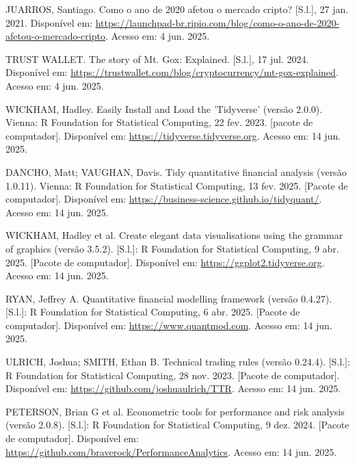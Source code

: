 \begin{thebibliography}{99}
     JUARROS, Santiago. Como o ano de 2020 afetou o mercado cripto? [S.l.], 27 jan. 2021. Disponível em: 
    \href{https://launchpad-br.ripio.com/blog/como-o-ano-de-2020-afetou-o-mercado-cripto}{https://launchpad-br.ripio.com/blog/como-o-ano-de-2020-afetou-o-mercado-cripto}. 
    Acesso em: 4 jun. 2025.
    
     TRUST WALLET. The story of Mt. Gox: Explained. [S.l.], 17 jul. 2024. Disponível em: 
    \href{https://trustwallet.com/blog/cryptocurrency/mt-gox-explained}{https://trustwallet.com/blog/cryptocurrency/mt-gox-explained}. 
    Acesso em: 4 jun. 2025.
    
     WICKHAM, Hadley. Easily Install and Load the 'Tidyverse' (versão 2.0.0). Vienna: R Foundation for Statistical Computing, 22 fev. 2023. [pacote de computador]. Disponível em: 
    \href{https://tidyverse.tidyverse.org}{https://tidyverse.tidyverse.org}. 
    Acesso em: 14 jun. 2025.
    
     DANCHO, Matt; VAUGHAN, Davis. Tidy quantitative financial analysis (versão 1.0.11). Vienna: R Foundation for Statistical Computing, 13 fev. 2025. [Pacote de computador]. Disponível em: 
    \href{https://business-science.github.io/tidyquant/}{https://business-science.github.io/tidyquant/}. 
    Acesso em: 14 jun. 2025.
    
     WICKHAM, Hadley et al. Create elegant data visualisations using the grammar of graphics (versão 3.5.2). [S.l.]: R Foundation for Statistical Computing, 9 abr. 2025. [Pacote de computador]. Disponível em: 
    \href{https://ggplot2.tidyverse.org}{https://ggplot2.tidyverse.org}. 
    Acesso em: 14 jun. 2025.
    
     RYAN, Jeffrey A. Quantitative financial modelling framework (versão 0.4.27). [S.l.]: R Foundation for Statistical Computing, 6 abr. 2025. [Pacote de computador]. Disponível em: 
    \href{https://www.quantmod.com}{https://www.quantmod.com}. 
    Acesso em: 14 jun. 2025.
    
     ULRICH, Joshua; SMITH, Ethan B. Technical trading rules (versão 0.24.4). [S.l.]: R Foundation for Statistical Computing, 28 nov. 2023. [Pacote de computador]. Disponível em: 
    \href{https://github.com/joshuaulrich/TTR}{https://github.com/joshuaulrich/TTR}. 
    Acesso em: 14 jun. 2025.
    
     PETERSON, Brian G et al. Econometric tools for performance and risk analysis (versão 2.0.8). [S.l.]: R Foundation for Statistical Computing, 9 dez. 2024. [Pacote de computador]. Disponível em: 
    \href{https://github.com/braverock/PerformanceAnalytics}{https://github.com/braverock/PerformanceAnalytics}. 
    Acesso em: 14 jun. 2025.
    

\end{thebibliography}
